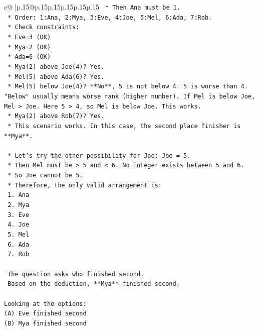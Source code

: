 \documentclass{article}
\begin{document}
{\begin{supertabular}{c@{$\;$}|p{.15\linewidth}@{}p{.15\linewidth}p{.15\linewidth}p{.15\linewidth}p{.15\linewidth}p{.15\linewidth}}
{{{\texttt{        *   Then Ana must be 1.} \\
\texttt{        *   Order: 1:Ana, 2:Mya, 3:Eve, 4:Joe, 5:Mel, 6:Ada, 7:Rob.} \\
\texttt{        *   Check constraints:} \\
\texttt{            *   Eve=3 (OK)} \\
\texttt{            *   Mya=2 (OK)} \\
\texttt{            *   Ada=6 (OK)} \\
\texttt{            *   Mya(2) above Joe(4)? Yes.} \\
\texttt{            *   Mel(5) above Ada(6)? Yes.} \\
\texttt{            *   Mel(5) below Joe(4)? **No**, 5 is not below 4. 5 is worse than 4. "Below" usually means worse rank (higher number). If Mel is below Joe, Mel > Joe. Here 5 > 4, so Mel is below Joe. This works.} \\
\texttt{            *   Mya(2) above Rob(7)? Yes.} \\
\texttt{        *   This scenario works. In this case, the second place finisher is **Mya**.} \\
\\ 
\texttt{    *   Let's try the other possibility for Joe: Joe = 5.} \\
\texttt{        *   Then Mel must be > 5 and < 6. No integer exists between 5 and 6.} \\
\texttt{        *   So Joe cannot be 5.} \\
\texttt{    *   Therefore, the only valid arrangement is:} \\
\texttt{        1. Ana} \\
\texttt{        2. Mya} \\
\texttt{        3. Eve} \\
\texttt{        4. Joe} \\
\texttt{        5. Mel} \\
\texttt{        6. Ada} \\
\texttt{        7. Rob} \\
\\ 
\texttt{    The question asks who finished second.} \\
\texttt{    Based on the deduction, **Mya** finished second.} \\
\\ 
\texttt{Looking at the options:} \\
\texttt{(A) Eve finished second} \\
\texttt{(B) Mya finished second} \\
}}}
\end{supertabular}}
\end{document}
